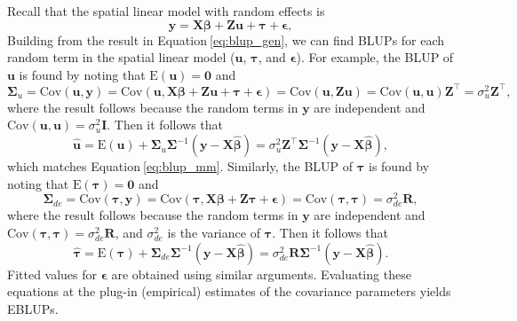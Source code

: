 \documentclass{article}
\begin{document}
Recall that the spatial linear model with random effects is
\begin{equation*}
  \mathbf{y} = \mathbf{X} \boldsymbol{\beta} + \mathbf{Z} \mathbf{u} + \boldsymbol{\tau} + \boldsymbol{\epsilon},
\end{equation*} Building from the result in
Equation\(~\)\ref{eq:blup_gen}, we can find BLUPs for each random term
in the spatial linear model (\(\mathbf{u}\), \(\boldsymbol{\tau}\), and
\(\boldsymbol{\epsilon}\)). For example, the BLUP of \(\mathbf{u}\) is
found by noting that \(\text{E}(\mathbf{u}) = \mathbf{0}\) and
\begin{equation*}
  \mathbf{\Sigma}_u = \text{Cov}(\mathbf{u}, \mathbf{y}) = \text{Cov}(\mathbf{u}, \mathbf{X} \boldsymbol{\beta} + \mathbf{Z} \mathbf{u} + \boldsymbol{\tau} + \boldsymbol{\epsilon}) = \text{Cov}(\mathbf{u}, \mathbf{Z}\mathbf{u}) = \text{Cov}(\mathbf{u}, \mathbf{u})\mathbf{Z}^\top = \sigma^2_u \mathbf{Z}^\top,
\end{equation*} where the result follows because the random terms in
\(\mathbf{y}\) are independent and
\(\text{Cov}(\mathbf{u}, \mathbf{u}) = \sigma^2_u \mathbf{I}\). Then it
follows that \begin{equation*}
  \hat{\mathbf{u}} = \text{E}(\mathbf{u}) + \boldsymbol{\Sigma}_u \boldsymbol{\Sigma}^{-1}(\mathbf{y} - \mathbf{X} \boldsymbol{\hat{\beta}}) = \sigma^2_u \mathbf{Z}^\top \boldsymbol{\Sigma}^{-1}(\mathbf{y} - \mathbf{X} \boldsymbol{\hat{\beta}}),
\end{equation*} which matches Equation\(~\)\ref{eq:blup_mm}. Similarly,
the BLUP of \(\boldsymbol{\tau}\) is found by noting that
\(\text{E}(\boldsymbol{\tau}) = \mathbf{0}\) and \begin{equation*}
  \mathbf{\Sigma}_{de} = \text{Cov}(\boldsymbol{\tau}, \mathbf{y}) = \text{Cov}(\boldsymbol{\tau}, \mathbf{X} \boldsymbol{\beta} + \mathbf{Z} \boldsymbol{\tau} + \boldsymbol{\epsilon}) = \text{Cov}(\boldsymbol{\tau}, \boldsymbol{\tau}) = \sigma^2_{de} \mathbf{R},
\end{equation*} where the result follows because the random terms in
\(\mathbf{y}\) are independent and
\(\text{Cov}(\boldsymbol{\tau}, \boldsymbol{\tau}) = \sigma^2_{de} \mathbf{R}\),
and \(\sigma^2_{de}\) is the variance of \(\boldsymbol{\tau}\). Then it
follows that \begin{equation}\label{eq:blup_sp}
  \hat{\boldsymbol{\tau}} = \text{E}(\boldsymbol{\tau}) + \boldsymbol{\Sigma}_{de} \boldsymbol{\Sigma}^{-1}(\mathbf{y} - \mathbf{X} \boldsymbol{\hat{\beta}}) = \sigma^2_{de} \mathbf{R} \boldsymbol{\Sigma}^{-1}(\mathbf{y} - \mathbf{X} \boldsymbol{\hat{\beta}}).
\end{equation} Fitted values for \(\boldsymbol{\epsilon}\) are obtained
using similar arguments. Evaluating these equations at the plug-in
(empirical) estimates of the covariance parameters yields EBLUPs.
\end{document}
